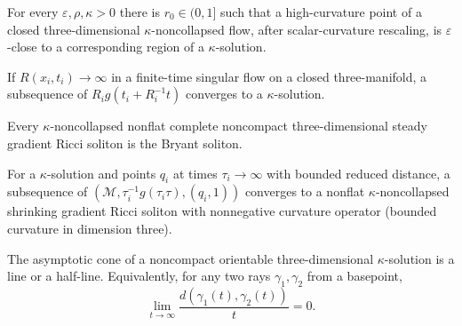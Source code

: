 \begin{theorem}
\label{thm:chow-iv-canonical-neighborhood}
For every \(\varepsilon,\rho,\kappa>0\) there is \(r_0\in(0,1]\) such that a
high-curvature point of a closed three-dimensional \(\kappa\)-noncollapsed
flow, after scalar-curvature rescaling, is \(\varepsilon\)-close to a
corresponding region of a \(\kappa\)-solution.
\end{theorem}

\begin{theorem}
\label{thm:chow-iv-3d-models-all-scales}
If \(R(x_i,t_i)\to\infty\) in a finite-time singular flow on a closed
three-manifold, a subsequence of
\(R_i g(t_i+R_i^{-1}t)\) converges to a \(\kappa\)-solution.
\end{theorem}

\begin{theorem}
\label{thm:chow-iv-bryant-classification}
Every \(\kappa\)-noncollapsed nonflat complete noncompact three-dimensional
steady gradient Ricci soliton is the Bryant soliton.
\end{theorem}

\begin{theorem}
\label{thm:chow-iv-asymptotic-shrinker}
For a \(\kappa\)-solution and points \(q_i\) at times \(\tau_i\to\infty\)
with bounded reduced distance, a subsequence of
\((\mathcal M,\tau_i^{-1}g(\tau_i\tau),(q_i,1))\) converges to a nonflat
\(\kappa\)-noncollapsed shrinking gradient Ricci soliton with nonnegative
curvature operator (bounded curvature in dimension three).
\end{theorem}

\begin{theorem}
\label{thm:chow-iv-3d-asymptotic-cone}
The asymptotic cone of a noncompact orientable three-dimensional
\(\kappa\)-solution is a line or a half-line.  Equivalently, for any two rays
\(\gamma_1,\gamma_2\) from a basepoint,
\[
\lim_{t\to\infty}\frac{d(\gamma_1(t),\gamma_2(t))}{t}=0.
\]
\end{theorem}

